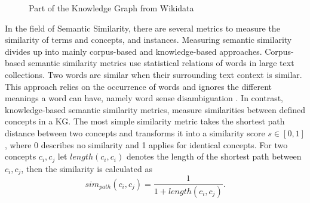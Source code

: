 \documentclass[pdftex,a4paper,12pt]{scrartcl}
\theoremstyle{definition}
\begin{document}
\begin{figure}

    \centering
    \caption{Part of the Knowledge Graph from Wikidata}
    \label{fig:kg}
\end{figure}

In the field of Semantic Similarity, there are several metrics to measure the similarity of terms and concepts, and instances.
Measuring semantic similarity divides up into mainly corpus-based and knowledge-based approaches. Corpus-based semantic similarity metrics use statistical relations of words in large text collections. Two words are similar when their surrounding text context is similar. This approach relies on the occurrence of words and ignores the different meanings a word can have, namely word sense disambiguation \citep{zhu_computing_2017}. 
In contrast, knowledge-based semantic similarity metrics, measure similarities between defined concepts in a KG. The most simple similarity metric takes the shortest path distance between two concepts and transforms it into a similarity score $s \in [0,1]$, where $0$ describes no similarity and 1 applies for identical concepts. For two concepts $c_i,c_j$ let $length(c_i,c_i)$ denotes the length of the shortest path between $c_i,c_j$, then the similarity is calculated as 
\begin{equation}
    sim_{path}(c_i,c_j) = \frac{1}{1+length(c_i,c_j)}.
\end{equation}
\end{document}
